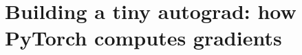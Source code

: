 \chapter{Building a tiny autograd: how PyTorch computes gradients}
\label{ch:building-a-tiny-autograd-how-pytorch}

